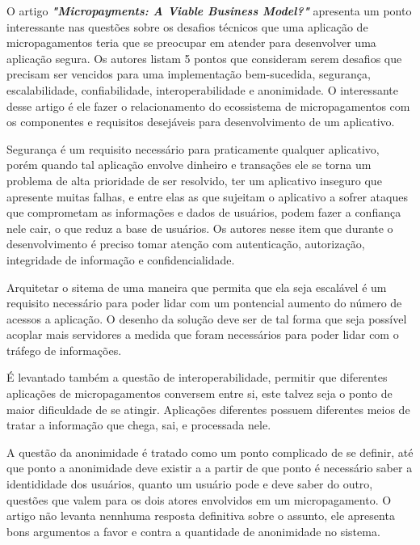 \documentclass[hidelinks,12pt]{article}
\begin{document}
O artigo \textbf{\textit{"Micropayments: A Viable Business Model?"}} \cite{stanford} apresenta um ponto interessante nas quest\~oes sobre os desafios t\'ecnicos que uma aplica\c{c}\~ao de micropagamentos teria que se preocupar em atender para desenvolver uma aplica\c{c}\~ao segura. Os autores listam 5 pontos que consideram serem desafios que precisam ser vencidos para uma implementa\c{c}\~ao bem-sucedida, seguran\c{c}a, escalabilidade, confiabilidade, interoperabilidade e anonimidade. O interessante desse artigo \'e ele fazer o relacionamento do ecossistema de micropagamentos com os componentes e requisitos desej\'aveis para desenvolvimento de um aplicativo. 

Seguran\c{c}a \'e um requisito necess\'ario para praticamente qualquer aplicativo, por\'em quando tal aplica\c{c}\~ao envolve dinheiro e transa\c{c}\~oes ele se torna um problema de alta prioridade de ser resolvido, ter um aplicativo inseguro que apresente muitas falhas, e entre elas as que sujeitam o aplicativo a sofrer ataques que comprometam as informa\c{c}\~oes e dados de usu\'arios, podem fazer a confian\c{c}a nele cair, o que reduz a base de usu\'arios. Os autores nesse item que durante o desenvolvimento \'e preciso tomar aten\c{c}\~ao com autentica\c{c}\~ao, autoriza\c{c}\~ao, integridade de informa\c{c}\~ao e confidencialidade.

Arquitetar o sitema de uma maneira que permita que ela seja escal\'avel \'e um requisito necess\'ario para poder lidar com um pontencial aumento do n\'umero de acessos a aplica\c{c}\~ao. O desenho da solu\c{c}\~ao deve ser de tal forma que seja poss\'ivel acoplar mais servidores a medida que foram necess\'arios para poder lidar com o tr\'afego de informa\c{c}\~oes.

\'E levantado tamb\'em a quest\~ao de interoperabilidade, permitir que diferentes aplica\c{c}\~oes de micropagamentos conversem entre si, este talvez seja o ponto de maior dificuldade de se atingir. Aplica\c{c}\~oes diferentes possuem diferentes meios de tratar a informa\c{c}\~ao que chega, sai, e processada nele.


A quest\~ao da anonimidade \'e tratado como um ponto complicado de se definir, at\'e que ponto a anonimidade deve existir a a partir de que ponto \'e necess\'ario saber a identididade dos usu\'arios, quanto um usu\'ario pode e deve saber do outro, quest\~oes que valem para os dois atores envolvidos em um micropagamento. O artigo n\~ao levanta nennhuma resposta definitiva sobre o assunto, ele apresenta bons argumentos a favor e contra a quantidade de anonimidade no sistema.
\end{document}
